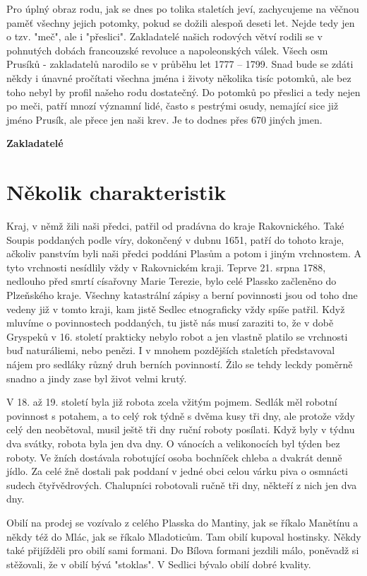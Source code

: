 \documentclass[../dejiny-rodu-prusiku.tex]{subfiles}
\begin{document}
Pro úplný obraz rodu, jak se dnes po tolika staletích jeví, zachycujeme na věčnou paměť všechny jejich po­tomky, pokud se dožili alespoň deseti let. Nejde tedy jen o tzv. "meč", ale i "přeslici". Zakladatelé našich rodových větví rodili se v pohnutých dobách francouzské revoluce a napoleonských válek. Všech osm Prusíků - zakladatelů narodilo se v průběhu let 1777 – 1799. Snad bude se zdáti někdy i únavné pročítati všechna jména i životy několika tisíc potomků, ale bez toho nebyl by profil našeho rodu dostatečný. Do potomků po přeslici a tedy nejen po meči, patří mnozí  významní lidé, často s pestrými osudy, nemající sice již jméno Prusík, ale přece jen naši krev. Je to dodnes přes 670 jiných jmen.

\textbf{Zakladatelé}

\section{Několik charakteristik}
Kraj, v němž žili naši předci, patřil od pradávna do kraje Rakovnického. Také Soupis poddaných podle víry, dokončený v dubnu 1651, patří do tohoto kraje, ačkoliv panstvím byli naši předci poddáni Plasům a potom i jiným vrchnostem. A tyto vrchnosti nesídlily vždy v Rakovnickém kraji. Teprve 21. srpna 1788, nedlouho před smrtí císařovny Marie Terezie, bylo celé Plassko začleněno do Plzeňského kraje. Všechny katastrální zápisy a berní povinnosti jsou od toho dne vedeny již v tomto kraji, kam jistě Sedlec etnograficky vždy spíše patřil. Když mluvíme o povinnostech poddaných, tu jistě nás musí zaraziti to, že v době Gryspeků v 16. století prakticky nebylo robot a jen vlastně platilo se vrchnosti buď naturáliemi, nebo penězi. I v mnohem pozdějších staletích představoval nájem pro sedláky různý druh berních povinností. Žilo se tehdy leckdy poměrně snadno a jindy zase byl život velmi krutý.

V 18. až 19. století byla již robota zcela vžitým pojmem. Sedlák měl robotní povinnost s potahem, a to celý rok týdně s dvěma kusy tři dny, ale protože vždy celý den neobětoval, musil ještě tři dny ruční roboty posílati. Když byly v týdnu dva svátky, robota byla jen dva dny. O vánocích a velikonocích byl týden bez roboty. Ve žních dostávala robotující osoba bochníček chleba a dvakrát denně jídlo. Za celé žně dostali pak poddaní v jedné obci celou várku piva o osmnácti sudech čtyřvědrových. Chalupníci robotovali ručně tři dny, někteří z nich jen dva dny.

Obilí na prodej se vozívalo z celého Plasska do Mantiny, jak se říkalo Manětínu a někdy též do Mlác, jak se říkalo Mladoticům. Tam obilí kupoval hostinsky. Někdy také přijížděli pro obilí sami formani. Do Bílova formani jezdili málo, poněvadž si stěžovali, že v obilí bývá "stoklas". V Sedlici bývalo obilí dobré kvality.
\end{document}
